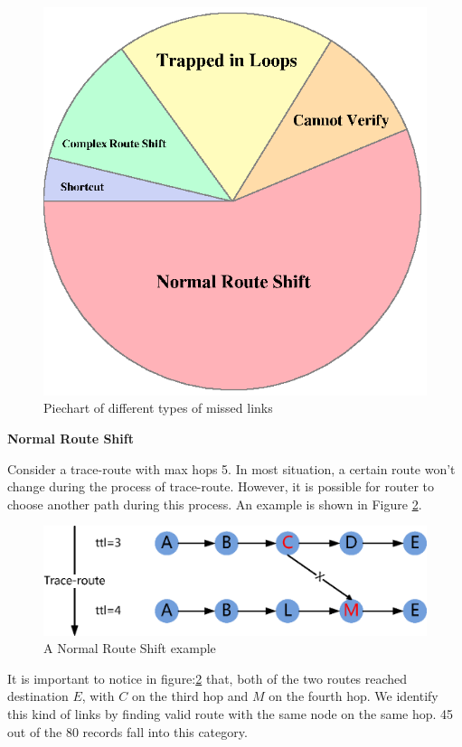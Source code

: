 \documentclass[conference, twocolumn, oneside, 10pt]{IEEEtran}
\begin{document}
\begin{figure}[h!]
  \centering
  \includegraphics[scale=0.8]{plot/PieChart.eps}
  \caption{Piechart of different types of missed links}
  \label{fig:PieChart}
\end{figure}

\textbf{Normal Route Shift}

Consider a trace-route with max hops 5. In most situation, a certain route won't change during the process of trace-route. However, it is possible for router to choose another path during this process. An example is shown in Figure \ref{fig:NormalRouteShift}.

\begin{figure}[h!]
  \centering
  \includegraphics[scale=0.5]{plot/RouteShift.eps}
  \caption{A Normal Route Shift example}
  \label{fig:NormalRouteShift}
\end{figure}

It is important to notice in figure:\ref{fig:NormalRouteShift} that, both of the two routes reached destination $E$, with $C$ on the third hop and $M$ on the fourth hop. We identify this kind of links by finding valid route with the same node on the same hop. 45 out of the 80 records fall into this category.
\end{document}
